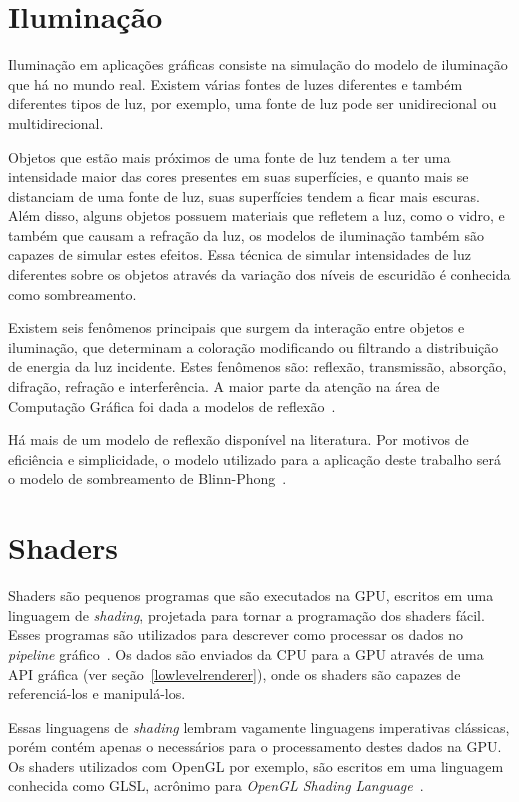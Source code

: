 \section{Iluminação}

Iluminação em aplicações gráficas consiste na simulação do modelo de iluminação que há 
no mundo real. Existem várias fontes de luzes diferentes e também diferentes tipos de 
luz, por exemplo, uma fonte de luz pode ser unidirecional ou multidirecional.

Objetos que estão mais próximos de uma fonte de luz tendem a ter uma intensidade maior 
das cores presentes em suas superfícies, e quanto mais se distanciam de uma fonte de 
luz, suas superfícies tendem a ficar mais escuras. Além disso, alguns objetos possuem 
materiais que refletem a luz, como o vidro, e também que causam a refração da luz, os 
modelos de iluminação também são capazes de simular estes efeitos. Essa técnica de 
simular intensidades de luz diferentes sobre os objetos através da variação dos níveis 
de escuridão é conhecida como sombreamento.

Existem seis fenômenos principais que surgem da interação entre objetos e iluminação, 
que determinam a coloração modificando ou filtrando a distribuição de energia da luz 
incidente. Estes fenômenos são: reflexão, transmissão, absorção, difração, refração e 
interferência. A maior parte da atenção na área de Computação Gráfica foi dada a modelos 
de reflexão~\cite{Watt2003GVA}.

Há mais de um modelo de reflexão disponível na literatura. Por motivos de eficiência e 
simplicidade, o modelo utilizado para a aplicação deste trabalho será o modelo de 
sombreamento de Blinn-Phong~\cite{Blinn1977MLR}.

\section{Shaders}

Shaders são pequenos programas que são executados na GPU, escritos em uma linguagem de 
\textit{shading}, projetada para tornar a programação dos shaders fácil. 
Esses programas são utilizados para descrever como processar os dados no 
\textit{pipeline} gráfico~\cite{hughes2014computer}. Os dados são enviados da CPU para 
a GPU através de uma API gráfica (ver seção~\ref{lowlevelrenderer}), onde os shaders 
são capazes de referenciá-los e manipulá-los.

Essas linguagens de \textit{shading} lembram vagamente linguagens imperativas 
clássicas, porém contém apenas o necessários para o processamento destes dados na GPU. 
Os shaders utilizados com OpenGL por exemplo, são escritos em uma linguagem conhecida 
como GLSL, acrônimo para \textit{OpenGL Shading Language}~\cite{shreiner2013opengl}.

